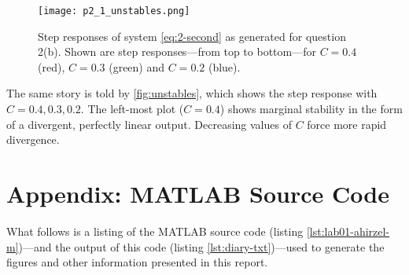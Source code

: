 \documentclass{ajhlabreport}
\begin{document}
\begin{figure}[H]
\centering
\texttt{[image: p2\_1\_unstables.png]}
\caption{Step responses of system \eqref{eq:2-second} as generated for question 2(b). Shown are step responses---from top to bottom---for $C=0.4$ ({\color{red}red}), $C=0.3$ ({\color{green}green}) and $C=0.2$ ({\color{blue}blue}).\label{fig:unstables}}
\end{figure}

The same story is told by \autoref{fig:unstables}, which shows the step
response with $C=0.4,0.3,0.2$. The left-most plot ($C=0.4$) shows marginal
stability in the form of a divergent, perfectly linear output. Decreasing
values of $C$ force more rapid divergence.

\newpage
\appendix
\chapter{Appendix: MATLAB Source Code}

What follows is a listing of the MATLAB source code (listing
\ref{lst:lab01-ahirzel-m})---and the output of this code (listing
\ref{lst:diary-txt})---used to generate the figures and other information
presented in this report.



\end{document}
